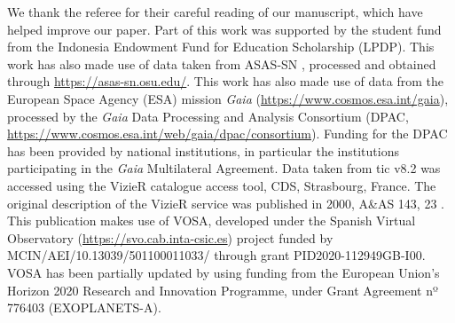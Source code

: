 \documentclass[letter]{aa} %
\begin{document}
\begin{acknowledgements}

We thank the referee for their careful reading of our manuscript, which have helped improve our paper.
%
Part of this work was supported by the student fund from the Indonesia Endowment Fund for Education Scholarship (LPDP). 
%
This work has also made use of data taken from ASAS-SN \citep{Shappee14, Kochanek17}, processed and obtained through \url{https://asas-sn.osu.edu/}.
%
This work has also made use of data from the European Space Agency (ESA) mission {\it Gaia} (\url{https://www.cosmos.esa.int/gaia}), processed by the {\it Gaia} Data Processing and Analysis Consortium (DPAC, \url{https://www.cosmos.esa.int/web/gaia/dpac/consortium}).
%
Funding for the DPAC has been provided by national institutions, in particular the institutions participating in the {\it Gaia} Multilateral Agreement. Data taken from tic v8.2 was accessed using the VizieR catalogue access tool, CDS, Strasbourg, France.%
%
The original description of the VizieR service was published in 2000, A\&AS 143, 23 \citep{2000A&AS..143...23O}.
%
This publication makes use of VOSA, developed under the Spanish Virtual Observatory (\url{https://svo.cab.inta-csic.es}) project funded by MCIN/AEI/10.13039/501100011033/ through grant PID2020-112949GB-I00.
VOSA has been partially updated by using funding from the European Union's Horizon 2020 Research and Innovation Programme, under Grant Agreement nº 776403 (EXOPLANETS-A).
% 

\end{acknowledgements}



\end{document}
